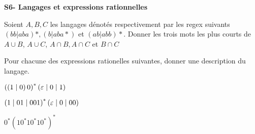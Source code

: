 \documentclass[french]{article}
\begin{document}
\begin{center}
    \huge{\textbf{S6- Langages et expressions rationnelles}}
\end{center}

\begin{exo}
    Soient \(A,B,C\) les langages dénotés respectivement par les regex suivants
    \((bb|aba)*, (b|aba*)\) et \((ab|abb)*\). Donner les trois mots les plus courts de
    \(A\cup B\), \(A\cup C\), \(A\cap B, A\cap C\) et \(B\cap C\)
\end{exo}

\begin{exo}
    Pour chacune des expressions rationelles suivantes, donner une description
    du langage.
    \begin{q}{1}
        \(\left(\left(1\mid0\right)0\right)^*\left(\varepsilon\mid0\mid1\right)\)
    \end{q}
    \begin{q}{2}
        \(\left(1\mid01\mid001\right)^*\left(\varepsilon\mid0\mid00\right)\)
    \end{q}
    \begin{q}{3}
        \(0^*\left(10^*10^*10^*\right)^*\)
    \end{q}
\end{exo}
\end{document}
